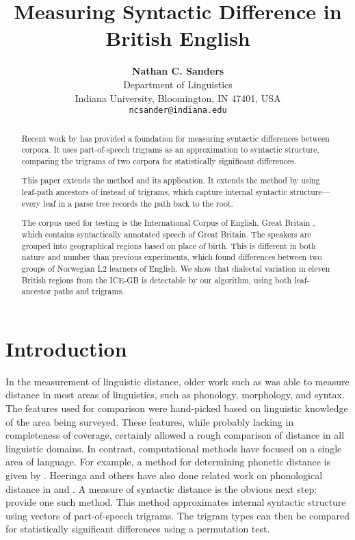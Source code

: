 \documentclass[11pt]{article}
\author{\textbf{Nathan C. Sanders} \\ Department of Linguistics \\
  Indiana University, Bloomington, IN 47401, USA \\ \texttt{ncsander@indiana.edu}}
\title{Measuring Syntactic Difference in British English}
\begin{document}
\maketitle
\begin{abstract}Recent work by
  \cite{nerbonne06} has provided a foundation for measuring
  syntactic differences between corpora. It uses part-of-speech trigrams as an
  approximation to syntactic structure, comparing the trigrams of two
  corpora for statistically significant differences.

  This paper extends the method and its application. It extends the
  method by using leaf-path ancestors of \cite{sampson00} instead of
  trigrams, which capture internal syntactic structure---every leaf in
  a parse tree records the path back to the root.

  The corpus used for testing is the International Corpus of English,
  Great Britain \cite{nelson02}, which contains syntactically
  annotated speech of Great Britain. The speakers are grouped into
  geographical regions based on place of birth. This is different in
  both nature and number than previous experiments, which found
  differences between two groups of Norwegian L2 learners of
  English. We show that dialectal variation in eleven British regions from the ICE-GB
  is detectable by our algorithm, using both leaf-ancestor paths and trigrams.
\end{abstract}

\section{Introduction}
In the measurement of linguistic distance, older work such as
\cite{seguy73} was able to measure distance in most areas of
linguistics, such as phonology, morphology, and syntax. The
features used for comparison were hand-picked based on
linguistic knowledge of the area being surveyed. These features,
while probably lacking in completeness of coverage, certainly allowed
a rough comparison of distance in all linguistic domains.
In contrast, computational methods have
focused on a single area of language. For example, a method for
determining phonetic distance is given by \cite{heeringa04}. Heeringa
and others have also done related work on phonological distance in
\cite{nerbonne97} and \cite{gooskens04}. A measure of syntactic
distance is the obvious next step: \cite{nerbonne06} provide one such
method. This method approximates internal syntactic structure using
vectors of part-of-speech trigrams. The trigram types can then be
compared for statistically significant differences using a permutation
test.
\end{document}
